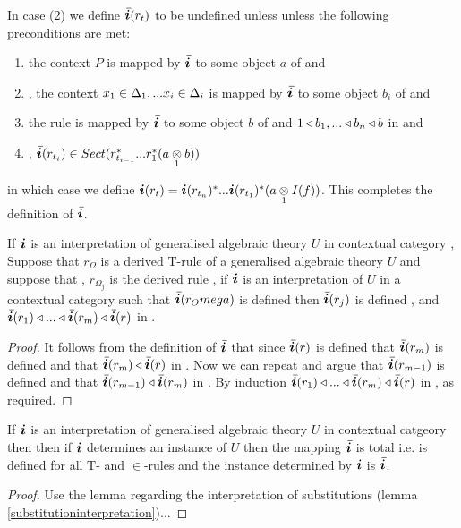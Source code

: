 \begin{definition} 
\begin{enumerate}[(i)]
In  case (2) 
we define $\Ibar(r_t)$ to be undefined unless  unless the following preconditions are met:
\begin{enumerate}
\item
the context  $P$ is mapped by $\Ibar$ to some object $a$ of \catcw and 
\item
\foreachi, the context $x_1 \in \Delta_1,... x_{i} \in \Delta_{i}$ is mapped by $\Ibar$ to some object $b_i$ of \catcw
and 
\item the rule \ZDelta is mapped by $\Ibar$ to some object $b$ of \catcw and
$1 \triangleleft b_1,...\triangleleft b_n \triangleleft b$ in \catcw 
and 
\item
\foreachi, $\Ibar(r_{t_i}) \in Sect(r_{t_{i-1}}^*...r_1^* (\crossx{a}{b}{1}))$
\end{enumerate}
in which case we
define $\Ibar(r_t)=\Ibar(r_{t_n})^*...\Ibar(r_{t_1})^*(\crossx{a}{I(f)}{1})$.
This completes the definition of $\Ibar$.
\end{enumerate}
\end{definition}


\begin{lemma}
If $\iI$ is an interpretation of generalised algebraic theory $U$ in contextual category \catcw,
Suppose that  $r_\Omega$ is a derived T-rule \ZOmega of a generalised algebraic theory $U$
and suppose that \foreachj, $r_{\Omega_j}$ is the derived rule
,
if $\iI$ is an interpretation of $U$ in a contextual category \catc
such that $\Ibar(r_Omega)$ is defined then
$\Ibar(r_j)$ is defined \foreachj, and 
$\Ibar(r_1) \base  ... \base \Ibar(r_m) \base \Ibar(r)$ in \catc.
\end{lemma}
\begin{proof}
It follows from the definition of $\Ibar$ that since $\Ibar(r)$ is defined that $\Ibar(r_m)$ is defined and that
$\Ibar(r_m) \base \Ibar(r)$ in \catc. Now we can repeat and argue that $\Ibar(r_{m-1})$ is defined and that $\Ibar(r_{m-1}) \base \Ibar(r_m)$
in \catc. By induction $\Ibar(r_1) \base  ... \base \Ibar(r_m) \base \Ibar(r)$ in \catc, as required.
\end{proof}

\begin{lemma} 
If $\iI$ is an interpretation of generalised algebraic theory $U$ in contextual catgeory \catcw then then if $\iI$ determines an instance of $U$ then the
mapping $\Ibar$  is total i.e. is defined for all T- and $\in$-rules and the instance determined by $\iI$ is $\Ibar$.
\end{lemma}
\begin{proof}  
Use the lemma regarding the interpretation of substitutions (lemma \ref{substitutioninterpretation})...
\end{proof}

